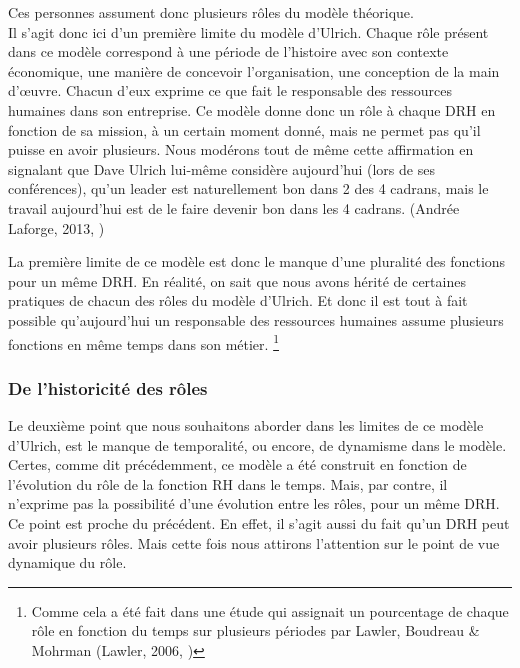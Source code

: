 
Ces personnes assument donc plusieurs rôles du modèle théorique. \\

Il s'agit donc ici d'un première limite du modèle d'Ulrich. Chaque rôle présent dans ce modèle correspond à une période de l'histoire avec son contexte économique, une manière de concevoir l'organisation, une conception de la main d'\oe{}uvre. Chacun d'eux exprime ce que fait le responsable des ressources humaines dans son entreprise. Ce modèle donne donc un rôle à chaque DRH en fonction de sa mission, à un certain moment donné, mais ne permet pas qu'il puisse en avoir plusieurs. Nous modérons tout de même cette affirmation en signalant que Dave Ulrich lui-même considère aujourd'hui (lors de ses conférences), qu'un leader est naturellement bon dans 2 des 4 cadrans, mais le travail aujourd'hui est de le faire devenir bon dans les 4 cadrans. (Andrée Laforge, 2013, \cite{capitalhumain})\newline 
{}

La première limite de ce modèle est donc le manque d'une pluralité des fonctions pour un même DRH. En réalité, on sait que nous avons hérité de certaines pratiques de chacun des rôles du modèle d'Ulrich. Et donc il est tout à fait possible qu'aujourd'hui un responsable des ressources humaines assume plusieurs fonctions en même temps dans son métier. \footnote{Comme cela a été fait dans une étude qui assignait un pourcentage de chaque rôle en fonction du temps sur plusieurs périodes par Lawler, Boudreau \& Mohrman (Lawler, 2006, \cite{Lawler2006})}\\


\subsubsection{De l'historicité des rôles}

Le deuxième point que nous souhaitons aborder dans les limites de ce modèle d'Ulrich, est le manque de temporalité, ou encore, de dynamisme dans le modèle. Certes, comme dit précédemment, ce modèle a été construit en fonction de l'évolution du rôle de la fonction RH dans le temps. Mais, par contre, il n'exprime pas la possibilité d'une évolution entre les rôles, pour un même DRH. Ce point est proche du précédent. En effet, il s'agit aussi du fait qu'un DRH peut avoir plusieurs rôles. Mais cette fois nous attirons l'attention sur le point de vue dynamique du rôle. \\

